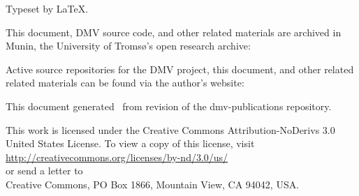 
\clearpage
\vspace*{\fill}

Typeset by \LaTeX.

This document, \gls{DMV} source code, and other related materials are archived
in Munin, the University of Tromsø's open research archive: \\
\muninurl

Active source repositories for the \gls{DMV} project, this document, and other
related related materials can be found via the author's website: \\
\dmvurl

This document generated \GITAuthorDate\ from revision \GITAbrHash{} of the
dmv-publications repository.

This work is licensed under the Creative Commons Attribution-NoDerivs 3.0 United
States License. To view a copy of this license, visit \\
\url{http://creativecommons.org/licenses/by-nd/3.0/us/} \\
or send a letter to \\
Creative Commons, PO Box 1866, Mountain View, CA 94042, USA.
